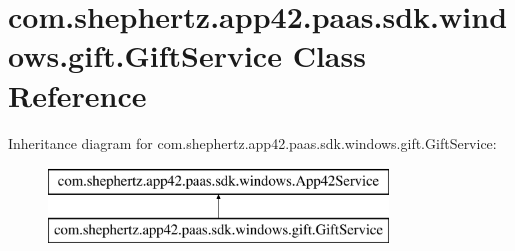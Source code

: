 \hypertarget{classcom_1_1shephertz_1_1app42_1_1paas_1_1sdk_1_1windows_1_1gift_1_1_gift_service}{\section{com.\+shephertz.\+app42.\+paas.\+sdk.\+windows.\+gift.\+Gift\+Service Class Reference}
\label{classcom_1_1shephertz_1_1app42_1_1paas_1_1sdk_1_1windows_1_1gift_1_1_gift_service}
}
Inheritance diagram for com.\+shephertz.\+app42.\+paas.\+sdk.\+windows.\+gift.\+Gift\+Service\+:\begin{figure}[H]
\begin{center}
\leavevmode
\includegraphics[height=2.000000cm]{classcom_1_1shephertz_1_1app42_1_1paas_1_1sdk_1_1windows_1_1gift_1_1_gift_service}
\end{center}
\end{figure}
